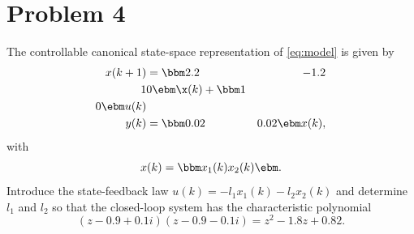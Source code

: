 \documentclass[a4paper]{scrartcl}
\begin{document}
\section*{Problem 4}
\label{sec-4}
The controllable canonical state-space representation of \eqref{eq:model} is given by
\begin{equation}
\begin{split}
x(k+1) &= \bbm 2.2 & -1.2\\1 & 0\ebm \x(k) + \bbm 1\\0\ebm u(k)\\
y(k) &= \bbm 0.02 & 0.02 \ebm x(k),
\end{split}
\end{equation}
with 
\[ x(k) = \bbm x_1(k)\\x_2(k)\ebm. \]
Introduce the state-feedback law $u(k) = -l_1x_1(k) -l_2x_2(k)$ and determine $l_1$ and $l_2$ so that the closed-loop system has the characteristic polynomial
\[ (z-0.9+0.1i)(z-0.9-0.1i) = z^2 -1.8z + 0.82. \]
\end{document}
